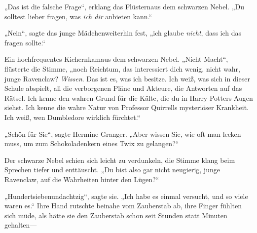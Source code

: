 „Das ist die falsche Frage“, erklang das Flüsternaus dem schwarzen Nebel. „Du solltest lieber fragen, was \emph{ich dir} anbieten kann.“

„Nein“, sagte das junge Mädchenweiterhin fest, „ich glaube \emph{nicht}, dass ich das fragen sollte.“

Ein hochfrequentes Kichernkamaus dem schwarzen Nebel. „Nicht Macht“, flüsterte die Stimme, „noch Reichtum, das interessiert dich wenig, nicht wahr, junge Ravenclaw? \emph{Wissen}. Das ist es, was ich besitze. Ich weiß, was sich in dieser Schule abspielt, all die verborgenen Pläne und Akteure, die Antworten auf das Rätsel. Ich kenne den wahren Grund für die Kälte, die du in Harry Potters Augen siehst. Ich kenne die wahre Natur von Professor Quirrells mysteriöser Krankheit. Ich weiß, wen Dumbledore wirklich fürchtet.“

„Schön für Sie“, sagte Hermine Granger. „Aber wissen Sie, wie oft man lecken muss, um zum Schokoladenkern eines Twix zu gelangen?“

Der schwarze Nebel schien sich leicht zu verdunkeln, die Stimme klang beim Sprechen tiefer und enttäuscht. „Du bist also gar nicht neugierig, junge Ravenclaw, auf die Wahrheiten hinter den Lügen?“

„Hundertsiebenundachtzig“, sagte sie. „Ich habe es einmal versucht, und so viele waren es.“ Ihre Hand rutschte beinahe vom Zauberstab ab, ihre Finger fühlten sich müde, als hätte sie den Zauberstab schon seit Stunden statt Minuten gehalten—

